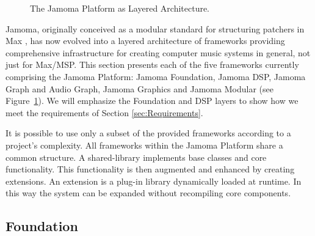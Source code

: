 \documentclass[twoside,10pt]{article}
\begin{document}
\begin{figure}[htbp]
\centerline{}
\caption{The Jamoma Platform as Layered Architecture.}
\label{fig:layers}
\end{figure}

Jamoma, originally conceived as a modular standard for structuring patchers in Max \cite{Place:2006}, has now evolved into a layered architecture of frameworks providing comprehensive infrastructure for creating computer music systems in general, not just for Max/MSP.  This section presents each of the five frameworks currently comprising the Jamoma Platform: Jamoma Foundation, Jamoma DSP, Jamoma Graph and Audio Graph, Jamoma Graphics and Jamoma Modular (see Figure~\ref{fig:layers}).  We will emphasize the Foundation and DSP layers to show how we meet the requirements of Section \ref{sec:Requirements}.
 
  
It is possible to use only a subset of the provided frameworks according to a project's complexity. 
All frameworks within the Jamoma Platform share a common structure.  A shared-library implements base classes and core functionality.  This functionality is then augmented and enhanced by creating extensions.  An extension is a plug-in library dynamically loaded at runtime.  In this way the system can be expanded without recompiling core components.


\subsection{Foundation} %
\end{document}
